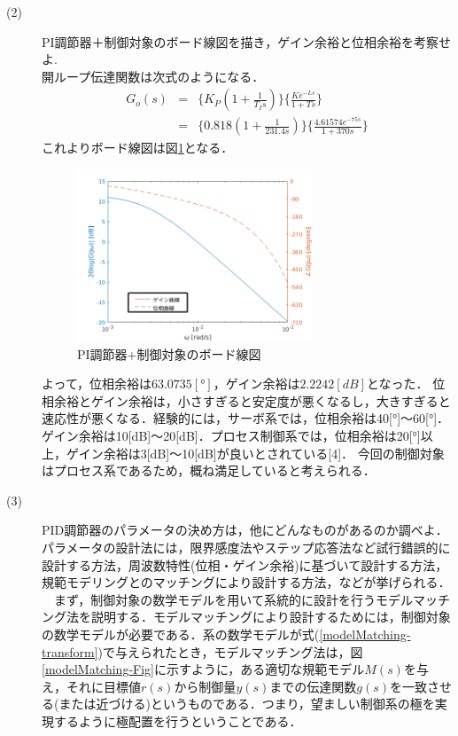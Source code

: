 \documentclass[12pt]{jsarticle}
\begin{document}
\begin{description}
\item[(2)]PI調節器＋制御対象のボード線図を描き，ゲイン余裕と位相余裕を考察せよ.\\
開ループ伝達関数は次式のようになる．
\begin{eqnarray}
  \label{PID_openG}
  G_o(s) &=& \{K_P(1+\frac{1}{T_Is})\}\{\frac{Ke^{-Ls}}{1+Ts}\} \\
  &=& \{0.818(1+\frac{1}{231.4s})\}\{\frac{4.61574e^{-75s}}{1+370s}\}
\end{eqnarray}
これよりボード線図は図\ref{BodeChart_PID}となる．
\begin{figure}[tb]
  \begin{center}
    \includegraphics[clip,width=7.0cm]{../graph/BodeChart_PID.png}
    \caption{PI調節器+制御対象のボード線図}
    \label{BodeChart_PID}
  \end{center}
\end{figure}
よって，位相余裕は$63.0735[°]$，ゲイン余裕は$2.2242[dB]$となった．
位相余裕とゲイン余裕は，小さすぎると安定度が悪くなるし，大きすぎると速応性が悪くなる．経験的には，サーボ系では，位相余裕は40[°]〜60[°]．ゲイン余裕は10[dB]〜20[dB]．プロセス制御系では，位相余裕は20[°]以上，ゲイン余裕は3[dB]〜10[dB]が良いとされている[4]．%
今回の制御対象はプロセス系であるため，概ね満足していると考えられる．
\item[(3)]PID調節器のパラメータの決め方は，他にどんなものがあるのか調べよ．\\
パラメータの設計法には，限界感度法やステップ応答法など試行錯誤的に設計する方法，周波数特性(位相・ゲイン余裕)に基づいて設計する方法，規範モデリングとのマッチングにより設計する方法，などが挙げられる．\\
　まず，制御対象の数学モデルを用いて系統的に設計を行うモデルマッチング法を説明する．モデルマッチングにより設計するためには，制御対象の数学モデルが必要である．系の数学モデルが式(\ref{modelMatching-transform})で与えられたとき，モデルマッチング法は，図\ref{modelMatching-Fig}に示すように，ある適切な規範モデル$M(s)$を与え，それに目標値$r(s)$から制御量$y(s)$までの伝達関数$g(s)$を一致させる(または近づける)というものである．つまり，望ましい制御系の極を実現するように極配置を行うということである．\\

\end{description}
\end{document}

